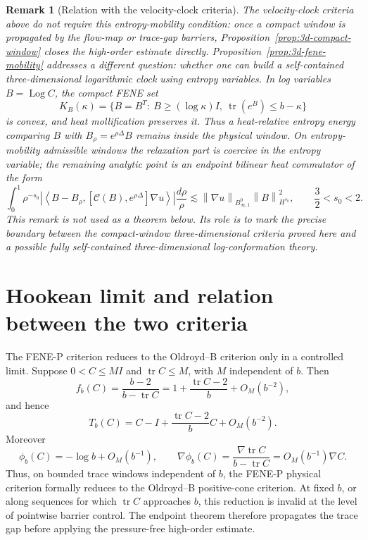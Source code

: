 \documentclass[11pt]{article}
\newtheorem{remark}{Remark}[section]
\newcommand{\Id}{I}
\newcommand{\tr}{\operatorname{tr}}
\newcommand{\Log}{\operatorname{Log}}
\newcommand{\calC}{\mathcal C}
\newcommand{\norm}[1]{\left\lVert #1\right\rVert}
\begin{document}
\begin{remark}[Relation with the velocity-clock criteria]
\label{rem:3d-heat-entropy-route}
The velocity-clock criteria above do not require this entropy-mobility condition: once a compact window is propagated by the flow-map or trace-gap barriers, Proposition~\ref{prop:3d-compact-window} closes the high-order estimate directly.  Proposition~\ref{prop:3d-fene-mobility} addresses a different question: whether one can build a self-contained three-dimensional logarithmic clock using entropy variables.  In log
variables \(B=\Log C\), the compact FENE set
\[
  K_B(\kappa)=\{B=B^T:\ B\ge(\log\kappa)I,\ \tr(e^B)\le b-\kappa\}
\]
is convex, and heat mollification preserves it.  Thus a heat-relative entropy
energy comparing \(B\) with \(B_\rho=e^{\rho\Delta}B\) remains inside the
physical window.  On entropy-mobility admissible windows the relaxation part is
coercive in the entropy variable; the remaining analytic point is an endpoint
bilinear heat commutator of the form
\[
  \int_0^1 \rho^{-s_0}
  \left|\left\langle B-B_\rho,
  [\calC(B),e^{\rho\Delta}]\nabla u\right\rangle\right|
  \frac{d\rho}{\rho}
  \lesssim
  \norm{\nabla u}_{B^0_{\infty,1}}\norm{B}_{H^{s_0}}^2,
  \qquad \frac32<s_0<2 .
\]
This remark is not used as a theorem below.  Its role is to mark the precise
boundary between the compact-window three-dimensional criteria proved here and
a possible fully self-contained three-dimensional log-conformation theory.
\end{remark}


\section{Hookean limit and relation between the two criteria}
\label{sec:hookean-limit}

The FENE-P criterion reduces to the Oldroyd--B criterion only in a controlled
limit.  Suppose \(0<C\le M\Id\) and \(\tr C\le M\), with \(M\) independent of
\(b\).  Then
\[
  f_b(C)=\frac{b-2}{b-\tr C}
  =1+\frac{\tr C-2}{b}+O_M(b^{-2}),
\]
and hence
\[
  T_b(C)=C-\Id+\frac{\tr C-2}{b}C+O_M(b^{-2}).
\]
Moreover
\[
  \phi_b(C)=-\log b+O_M(b^{-1}),\qquad
  \nabla\phi_b(C)=\frac{\nabla\tr C}{b-\tr C}=O_M(b^{-1})\nabla C .
\]
Thus, on bounded trace windows independent of \(b\), the FENE-P physical
criterion formally reduces to the Oldroyd--B positive-cone criterion.  At fixed
\(b\), or along sequences for which \(\tr C\) approaches \(b\), this reduction
is invalid at the level of pointwise barrier control.  The endpoint theorem
therefore propagates the trace gap before applying the pressure-free high-order
estimate.
\end{document}
